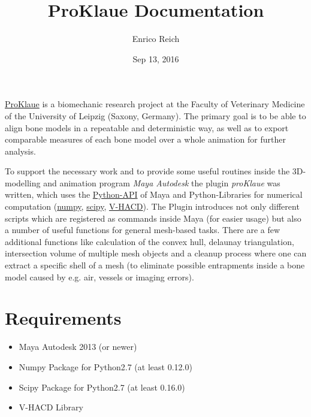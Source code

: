 \documentclass[letterpaper,10pt,english]{sphinxmanual}
\title{ProKlaue Documentation}
\date{Sep 13, 2016}
\author{Enrico Reich}
\begin{document}
\maketitle
\tableofcontents
{}\label{index::doc}

\label{index:module-proKlaue}
\href{http://www.zv.uni-leipzig.de/service/kommunikation/medienredaktion/nachrichten.html?ifab\_modus=detail\&ifab\_id=6004}{ProKlaue} is a biomechanic research project at the Faculty of Veterinary Medicine of the University of Leipzig (Saxony, Germany). The primary goal is to be able to align bone models in a repeatable and deterministic way, as well as to export comparable measures of each bone model over a whole animation for further analysis.

To support the necessary work and to provide some useful routines inside the 3D-modelling and animation program \emph{Maya Autodesk} the plugin \emph{proKlaue} was written, which uses the \href{http://download.autodesk.com/us/maya/2011help/CommandsPython/}{Python-API} of Maya and Python-Libraries for numerical computation (\href{http://www.numpy.org/}{numpy}, \href{https://www.scipy.org/}{scipy}, \href{https://github.com/kmammou/v-hacd}{V-HACD}). The Plugin introduces not only different scripts which are registered as commands inside Maya (for easier usage) but also a number of useful functions for general mesh-based tasks. There are a few additional functions like calculation of the convex hull, delaunay triangulation, intersection volume of multiple mesh objects and a cleanup process where one can extract a specific shell of a mesh (to eliminate possible entrapments inside a bone model caused by e.g. air, vessels or imaging errors).


\chapter{Requirements}
\label{index:welcome-to-proklaue-s-documentation}\label{index:main}\label{index:requirements}\label{index:module-proKlaue}\begin{itemize}
\item {} 
Maya Autodesk 2013 (or newer)

\item {} 
Numpy Package for Python2.7 (at least 0.12.0)

\item {} 
Scipy Package for Python2.7 (at least 0.16.0)

\item {} 
V-HACD Library

\end{itemize}
\end{document}
